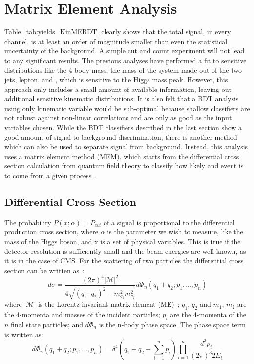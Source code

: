 \section{Matrix Element Analysis}

Table~\ref{tab:yields_KinMEBDT} clearly shows that the total signal, in every channel, is at least an order of magnitude smaller than even the statistical uncertainty of the background.
A simple cut and count experiment will not lead to any significant results.
The previous \HWWlnujj analyses have performed a fit to sensitive distributions like the 4-body mass, the mass of the system made out of the two jets, lepton, and \ETslash, which is sensitive to the Higgs mass peak.
However, this approach only includes a small amount of available information, leaving out additional sensitive kinematic distributions.
It is also felt that a BDT analysis using only kinematic variable would be sub-optimal because shallow classifiers are not robust against non-linear correlations and are only as good as the input variables chosen.
While the BDT classifiers described in the last section show a good amount of signal to background discrimination, there is another method which can also be used to separate signal from background.
Instead, this analysis uses a matrix element method (MEM), which starts from the differential cross section calculation from quantum field theory to classify how likely and event is to come from a given process~\cite{Canelli2003,Dong2008}.

\subsection{Differential Cross Section}

The probability $P\left(x;\alpha\right)=P_{evt}$ of a signal is proportional to the differential production cross section, where $\alpha$ is the parameter we wish to measure, like the mass of the Higgs boson, and x is a set of physical variables.
This is true if the detector resolution is sufficiently small and the beam energies are well known, as it is in the case of CMS.
For the scattering of two particles the differential cross section can be written as~\cite{Olive:2016xmw}:
\begin{equation}\label{eq:differential_production_cross_section}
d\sigma=\frac{\left(2\pi\right)^{4}|\mathcal{M}|^{2}}{4\sqrt{\left(q_{1}\cdot{q_{2}}\right)^{2}-m_{q_{1}}^{2}m_{q_{2}}^{2}}}d\Phi_{n}\left(q_{1}+q_{2};p_{1},...,p_{n}\right)
\end{equation}
where $|\mathcal{M}|$ is the Lorentz invariant matrix element (ME)~\cite{Griffiths2008}; $q_{1}$, $q_{2}$ and $m_{1}$, $m_{2}$ are the 4-momenta and masses of the incident particles; $p_{i}$ are the 4-momenta of the $n$ final state particles; and $d\Phi_{n}$ is the n-body phase space.
The phase space term is written as:
\begin{equation}
d\Phi_{n}\left(q_{1}+q_{2};p_{1},...,p_{n}\right)=\delta^{4}\left(q_{1}+q_{2}-\sum_{i=1}^{n}p_{i}\right)\prod_{i=1}^{n}\frac{d^{3}p_{i}}{\left(2\pi\right)^{3}2E_{i}}
\end{equation}

